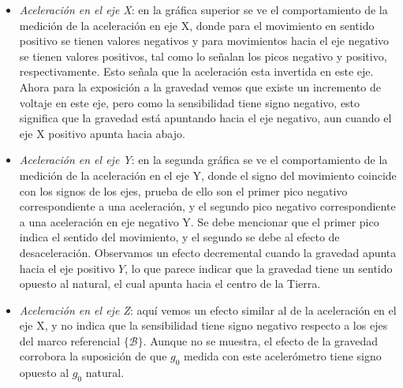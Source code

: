 \documentclass[10pt]{report}
\numberwithin{equation}{chapter}
\numberwithin{algorithm}{chapter}
\newcommand{\marco}[1]{\{\mathcal{#1}\}}
\begin{document}
\begin{itemize}
\item \emph{Aceleración en el eje X}: en la gráfica superior se ve el comportamiento de la medición de la aceleración en eje X, donde para el movimiento en sentido positivo se tienen valores negativos y para movimientos hacia el eje negativo se tienen valores positivos, tal como lo señalan los picos negativo y positivo, respectivamente. Esto señala que la aceleración esta invertida en este eje. Ahora para la exposición a la gravedad vemos que existe un incremento de voltaje en este eje, pero como la sensibilidad tiene signo negativo, esto significa que la gravedad está apuntando hacia el eje negativo, aun cuando el eje X positivo apunta hacia abajo.
\item \emph{Aceleración en el eje Y}: en la segunda gráfica se ve el comportamiento de la medición de la aceleración en el eje Y, donde el signo del movimiento coincide con los signos de los ejes, prueba de ello son el primer pico negativo correspondiente a una aceleración, y el segundo pico negativo correspondiente a una aceleración en eje negativo Y. Se debe mencionar que el primer pico indica el sentido del movimiento, y el segundo se debe al efecto de desaceleración. Observamos un efecto decremental cuando la gravedad apunta hacia el eje positivo $Y$, lo que parece indicar que la gravedad tiene un sentido opuesto al natural, el cual apunta hacia el centro de la Tierra.
\item \emph{Aceleración en el eje Z}: aquí vemos un efecto similar al de la aceleración en el eje X, y no indica que la sensibilidad tiene signo negativo respecto a los ejes del marco referencial $\marco{B}$. Aunque no se muestra, el efecto de la gravedad corrobora la suposición de que $g_0$ medida con este acelerómetro tiene signo opuesto al $g_0$ natural.
\end{itemize}
\end{document}
